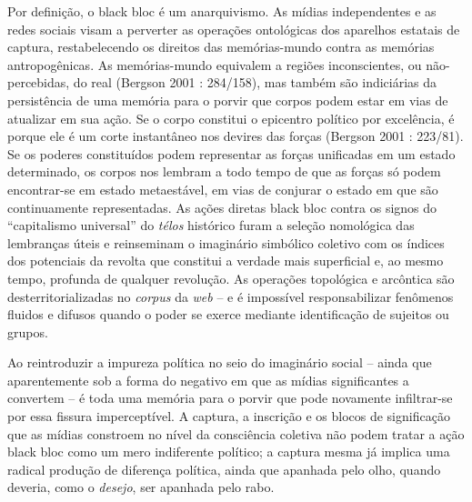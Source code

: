 Por definição, o black bloc é um anarquivismo. As mídias independentes e
as redes sociais visam a perverter as operações ontológicas dos
aparelhos estatais de captura, restabelecendo os direitos das
memórias-mundo contra as memórias antropogênicas. As memórias-mundo
equivalem a regiões inconscientes, ou não-percebidas, do real (Bergson
2001 : 284/158), mas também são indiciárias da persistência de uma
memória para o porvir que corpos podem estar em vias de atualizar em sua
ação. Se o corpo constitui o epicentro político por excelência, é porque
ele é um corte instantâneo nos devires das forças (Bergson 2001 :
223/81). Se os poderes constituídos podem representar as forças
unificadas em um estado determinado, os corpos nos lembram a todo tempo
de que as forças só podem encontrar-se em estado metaestável, em vias de
conjurar o estado em que são continuamente representadas. As ações
diretas black bloc contra os signos do ``capitalismo universal'' do
\emph{télos }histórico furam a seleção nomológica das lembranças úteis e
reinseminam o imaginário simbólico coletivo com os índices dos
potenciais da revolta que constitui a verdade mais superficial e, ao
mesmo tempo, profunda de qualquer revolução. As operações topológica e
arcôntica são desterritorializadas no \emph{corpus} da \emph{web }-- e é
impossível responsabilizar fenômenos fluidos e difusos quando o poder se
exerce mediante identificação de sujeitos ou grupos.

Ao reintroduzir a impureza política no seio do imaginário social --
ainda que aparentemente sob a forma do negativo em que as mídias
significantes a convertem -- é toda uma memória para o porvir que pode
novamente infiltrar-se por essa fissura imperceptível. A captura, a
inscrição e os blocos de significação que as mídias constroem no nível
da consciência coletiva não podem tratar a ação black bloc como um mero
indiferente político; a captura mesma já implica uma radical produção de
diferença política, ainda que apanhada pelo olho, quando deveria, como o
\emph{desejo}, ser apanhada pelo rabo.

